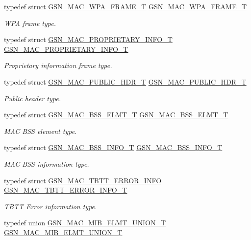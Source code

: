 \begin{DoxyCompactItemize}
typedef struct \hyperlink{a00137}{GSN\_\-MAC\_\-WPA\_\-FRAME\_\-T} \hyperlink{a00642_gadc2ef85538f39a0b8e01d199ccad1630}{GSN\_\-MAC\_\-WPA\_\-FRAME\_\-T}
\begin{DoxyCompactList}\small\item\em WPA frame type. \end{DoxyCompactList}\item 
typedef struct \hyperlink{a00123}{GSN\_\-MAC\_\-PROPRIETARY\_\-INFO\_\-T} \hyperlink{a00642_gaf102d7396d0f17159f993324bc63fc03}{GSN\_\-MAC\_\-PROPRIETARY\_\-INFO\_\-T}
\begin{DoxyCompactList}\small\item\em Proprietary information frame type. \end{DoxyCompactList}\item 
typedef struct \hyperlink{a00124}{GSN\_\-MAC\_\-PUBLIC\_\-HDR\_\-T} \hyperlink{a00642_ga83bfac29d319ebdbbc048906db949e06}{GSN\_\-MAC\_\-PUBLIC\_\-HDR\_\-T}
\begin{DoxyCompactList}\small\item\em Public header type. \end{DoxyCompactList}\item 
typedef struct \hyperlink{a00110}{GSN\_\-MAC\_\-BSS\_\-ELMT\_\-T} \hyperlink{a00642_ga741210948f906164f06f08b1b4705da8}{GSN\_\-MAC\_\-BSS\_\-ELMT\_\-T}
\begin{DoxyCompactList}\small\item\em MAC BSS element type. \end{DoxyCompactList}\item 
typedef struct \hyperlink{a00111}{GSN\_\-MAC\_\-BSS\_\-INFO\_\-T} \hyperlink{a00642_ga991bb63d940b90bac4f74912786f521d}{GSN\_\-MAC\_\-BSS\_\-INFO\_\-T}
\begin{DoxyCompactList}\small\item\em MAC BSS information type. \end{DoxyCompactList}\item 
typedef struct \hyperlink{a00134}{GSN\_\-MAC\_\-TBTT\_\-ERROR\_\-INFO} \hyperlink{a00642_ga172482aaa298a33c998f4206dd7e558a}{GSN\_\-MAC\_\-TBTT\_\-ERROR\_\-INFO\_\-T}
\begin{DoxyCompactList}\small\item\em TBTT Error information type. \end{DoxyCompactList}\item 
typedef union \hyperlink{a00117}{GSN\_\-MAC\_\-MIB\_\-ELMT\_\-UNION\_\-T} \hyperlink{a00642_ga64f7d136e7c2a14b7ea884d6ffd901c0}{GSN\_\-MAC\_\-MIB\_\-ELMT\_\-UNION\_\-T}

\end{DoxyCompactItemize}

